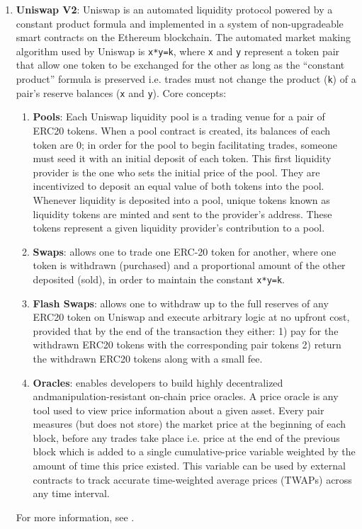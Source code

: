 \begin{enumerate}
\item\textbf{Uniswap V2}: Uniswap is an automated liquidity protocol powered by a constant product formula and implemented in a system of non-upgradeable smart contracts on the Ethereum blockchain. The automated market making algorithm used by Uniswap is \verb|x*y=k|, where \verb|x| and \verb|y| represent a token pair that allow one token to be exchanged for the other as long as the “constant product” formula is preserved i.e. trades must not change the product (\verb|k|) of a pair’s reserve balances (\verb|x| and \verb|y|). Core concepts:
	\begin{enumerate}
	\item\textbf{Pools}: Each Uniswap liquidity pool is a trading venue for a pair of ERC20 tokens. When a pool contract is created, its balances of each token are 0; in order for the pool to begin facilitating trades, someone must seed it with an initial deposit of each token. This first liquidity provider is the one who sets the initial price of the pool. They are incentivized to deposit an equal value of both tokens into the pool. Whenever liquidity is deposited into a pool, unique tokens known as liquidity tokens are minted and sent to the provider’s address. These tokens represent a given liquidity provider’s contribution to a pool.
	\item\textbf{Swaps}: allows one to trade one ERC-20 token for another, where one token is withdrawn (purchased) and a proportional amount of the other deposited (sold), in order to maintain the constant \verb|x*y=k|.
	\item\textbf{Flash Swaps}: allows one to withdraw up to the full reserves of any ERC20 token on Uniswap and execute arbitrary logic at no upfront cost, provided that by the end of the transaction they either: 1) pay for the withdrawn ERC20 tokens with the corresponding pair tokens 2) return the withdrawn ERC20 tokens along with a small fee.
	\item\textbf{Oracles}: enables developers to build highly decentralized and\linebreak manipulation-resistant on-chain price oracles. A price oracle is any tool used to view price information about a given asset. Every pair measures (but does not store) the market price at the beginning of each block, before any trades take place i.e. price at the end of the previous block which is added to a single cumulative-price variable weighted by the amount of time this price existed. This variable can be used by external contracts to track accurate time-weighted average prices (TWAPs) across any time interval.
	\end{enumerate}
For more information, see \cite{uniswapv2_blog}.


\end{enumerate}
